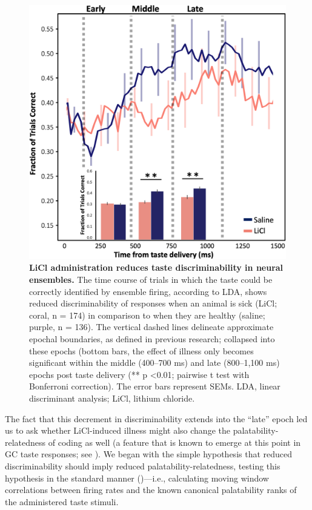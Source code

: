 \begin{refsection}
\begin{figure}
\includegraphics[width=\linewidth]{stone_2022_figs/journal.pbio.3001537.g005.png} 
\caption{\textbf{LiCl administration reduces taste discriminability in neural ensembles.} The time course of trials in which the taste could be correctly identified by ensemble firing, according to LDA, shows reduced discriminability of responses when an animal is sick (LiCl; coral, n = 174) in comparison to when they are healthy (saline; purple, n = 136). The vertical dashed lines delineate approximate epochal boundaries, as defined in previous research; collapsed into these epochs (bottom bars, the effect of illness only becomes significant within the middle (400–700 ms) and late (800–1,100 ms) epochs post taste delivery (** p \textless 0.01; pairwise t test with Bonferroni correction). The error bars represent SEMs. LDA, linear discriminant analysis; LiCl, lithium chloride.
}
\label{fig:wrapfig}
\end{figure}


The fact that this decrement in discriminability extends into the “late” epoch led us to ask whether LiCl-induced illness might also change the palatability-relatedness of coding as well (a feature that is known to emerge at this point in GC taste responses; see \cite{katz-a,katz2001a}). We began with the simple hypothesis that reduced discriminability should imply reduced palatability-relatedness, testing this hypothesis in the standard manner (\cite{sadacca2016a,levitan2019a,li2016a,piette2012a})—i.e., calculating moving window correlations between firing rates and the known canonical palatability ranks of the administered taste stimuli.


\end{refsection}
